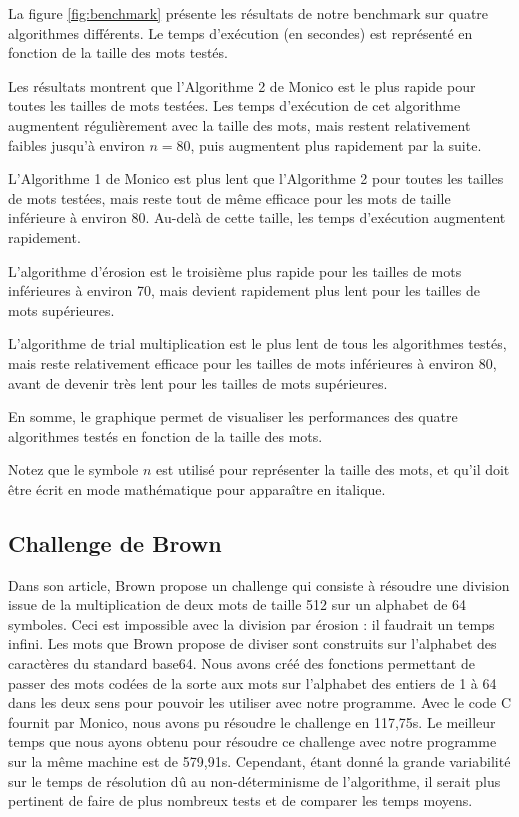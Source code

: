 La figure \ref{fig:benchmark} présente les résultats de notre benchmark sur quatre algorithmes différents.
Le temps d'exécution (en secondes) est représenté en fonction de la taille des mots testés.
\begin{flushleft}
	Les résultats montrent que l'Algorithme 2 de Monico est le plus rapide pour toutes les tailles de mots testées. Les temps d'exécution de cet algorithme augmentent régulièrement avec la taille des mots, mais restent relativement faibles jusqu'à environ $n=80$, puis augmentent plus rapidement par la suite.
	
	L'Algorithme 1 de Monico est plus lent que l'Algorithme 2 pour toutes les tailles de mots testées, mais reste tout de même efficace pour les mots de taille inférieure à environ 80. Au-delà de cette taille, les temps d'exécution augmentent rapidement.
	
	L'algorithme d'érosion est le troisième plus rapide pour les tailles de mots inférieures à environ 70, mais devient rapidement plus lent pour les tailles de mots supérieures.
	
	L'algorithme de trial multiplication est le plus lent de tous les algorithmes testés, mais reste relativement efficace pour les tailles de mots inférieures à environ 80, avant de devenir très lent pour les tailles de mots supérieures.
	
	En somme, le graphique permet de visualiser les performances des quatre algorithmes testés en fonction de la taille des mots.
\end{flushleft}

Notez que le symbole $n$ est utilisé pour représenter la taille des mots, et qu'il doit être écrit en mode mathématique pour apparaître en italique.

\subsection{Challenge de Brown}
Dans son article, Brown propose un challenge qui consiste à résoudre une division issue de la multiplication de deux mots de taille 512 sur un alphabet de 64 symboles. Ceci est impossible avec la division par érosion : il faudrait un temps infini. Les mots que Brown propose de diviser sont construits sur l'alphabet des caractères du standard base64. Nous avons créé des fonctions permettant de passer des mots codées de la sorte aux mots sur l'alphabet des entiers de 1 à 64 dans les deux sens pour pouvoir les utiliser avec notre programme. Avec le code C fournit par Monico, nous avons pu résoudre le challenge en 117,75s. Le meilleur temps que nous ayons obtenu pour résoudre ce challenge avec notre programme sur la même machine est de 579,91s. Cependant, étant donné la grande variabilité sur le temps de résolution dû au non-déterminisme de l'algorithme, il serait plus pertinent de faire de plus nombreux tests et de comparer les temps moyens.


